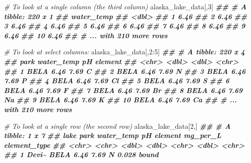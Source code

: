 \documentclass[
]{krantz}
\newenvironment{Shaded}{\begin{snugshade}}{\end{snugshade}}
\newcommand{\CommentTok}[1]{\textcolor[rgb]{0.56,0.35,0.01}{\textit{#1}}}
\newcommand{\DecValTok}[1]{\textcolor[rgb]{0.00,0.00,0.81}{#1}}
\newcommand{\DocumentationTok}[1]{\textcolor[rgb]{0.56,0.35,0.01}{\textbf{\textit{#1}}}}
\newcommand{\NormalTok}[1]{#1}
\newcommand{\SpecialCharTok}[1]{\textcolor[rgb]{0.00,0.00,0.00}{#1}}
\begin{document}
\begin{Shaded}
\begin{Highlighting}[]
\CommentTok{\# To look at a single column (the third column)}
\NormalTok{alaska\_lake\_data[,}\DecValTok{3}\NormalTok{]}
\DocumentationTok{\#\# \# A tibble: 220 x 1}
\DocumentationTok{\#\#    water\_temp}
\DocumentationTok{\#\#         \textless{}dbl\textgreater{}}
\DocumentationTok{\#\#  1       6.46}
\DocumentationTok{\#\#  2       6.46}
\DocumentationTok{\#\#  3       6.46}
\DocumentationTok{\#\#  4       6.46}
\DocumentationTok{\#\#  5       6.46}
\DocumentationTok{\#\#  6       6.46}
\DocumentationTok{\#\#  7       6.46}
\DocumentationTok{\#\#  8       6.46}
\DocumentationTok{\#\#  9       6.46}
\DocumentationTok{\#\# 10       6.46}
\DocumentationTok{\#\# \# ... with 210 more rows}

\CommentTok{\# To look at select columns:}
\NormalTok{alaska\_lake\_data[,}\DecValTok{2}\SpecialCharTok{:}\DecValTok{5}\NormalTok{]}
\DocumentationTok{\#\# \# A tibble: 220 x 4}
\DocumentationTok{\#\#    park  water\_temp    pH element}
\DocumentationTok{\#\#    \textless{}chr\textgreater{}      \textless{}dbl\textgreater{} \textless{}dbl\textgreater{} \textless{}chr\textgreater{}  }
\DocumentationTok{\#\#  1 BELA        6.46  7.69 C      }
\DocumentationTok{\#\#  2 BELA        6.46  7.69 N      }
\DocumentationTok{\#\#  3 BELA        6.46  7.69 P      }
\DocumentationTok{\#\#  4 BELA        6.46  7.69 Cl     }
\DocumentationTok{\#\#  5 BELA        6.46  7.69 S      }
\DocumentationTok{\#\#  6 BELA        6.46  7.69 F      }
\DocumentationTok{\#\#  7 BELA        6.46  7.69 Br     }
\DocumentationTok{\#\#  8 BELA        6.46  7.69 Na     }
\DocumentationTok{\#\#  9 BELA        6.46  7.69 K      }
\DocumentationTok{\#\# 10 BELA        6.46  7.69 Ca     }
\DocumentationTok{\#\# \# ... with 210 more rows}

\CommentTok{\# To look at a single row (the second row)}
\NormalTok{alaska\_lake\_data[}\DecValTok{2}\NormalTok{,]}
\DocumentationTok{\#\# \# A tibble: 1 x 7}
\DocumentationTok{\#\#   lake  park  water\_temp    pH element mg\_per\_L element\_type}
\DocumentationTok{\#\#   \textless{}chr\textgreater{} \textless{}chr\textgreater{}      \textless{}dbl\textgreater{} \textless{}dbl\textgreater{} \textless{}chr\textgreater{}      \textless{}dbl\textgreater{} \textless{}chr\textgreater{}       }
\DocumentationTok{\#\# 1 Devi\textasciitilde{} BELA        6.46  7.69 N          0.028 bound}


\end{Highlighting}
\end{Shaded}
\end{document}

